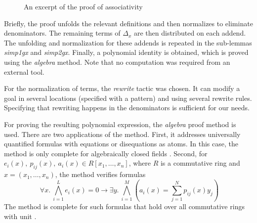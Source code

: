 \documentclass{llncs}
\begin{document}
\begin{figure}
	{}
	\caption{An excerpt of the proof of associativity}
	\label{fig:2}
\end{figure}


Briefly, the proof unfolds the relevant definitions and then
normalizes to eliminate denominators. The remaining terms of
$\Delta_x$ are then distributed on each addend. The unfolding and
normalization for these addends is repeated in the sub-lemmas
\textit{simp1gx} and \textit{simp2gx}. Finally, a polynomial
identity is obtained, which is proved using the \textit{algebra} method. 
Note that no computation was required from an external tool.

For the normalization of terms, the \textit{rewrite} tactic
\cite{noschinskipattern} was chosen. It can modify a goal in
several locations (specified with a pattern) and using several rewrite
rules. Specifying that rewriting happens in the denominators is
sufficient for our needs.

For proving the resulting polynomial expression, the \textit{algebra}
proof method \cite{chaieb2008automated} is used. There are two
applications of the method. First, it addresses universally quantified
formulas with equations or disequations as atoms. In this case, the
method is only complete for algebraically closed fields
\cite{wenzel2019isabelle}. Second, for $e_i(x),\ 
p_{ij}(x),\ a_i(x) \in R[x_1,\ldots,x_n]$,
where $R$ is a commutative ring and $x=(x_1,\ldots,x_n)$, 
the method verifies
formulas
\[
\; \forall x.\ \bigwedge_{i = 1}^L
e_i({x}) = 0 \to \exists{y}.\ \bigwedge_{i = 1}^M
\left(a_i(x) = \sum_{j = 1}^N p_{ij}({x}) y_j \right)
\] 
The method is complete for such formulas that hold over all
commutative rings with unit \cite{harrison2007automating}.

\end{document}
